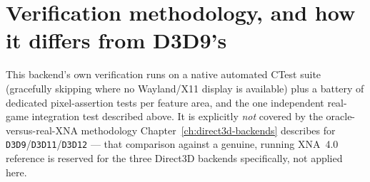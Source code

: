 \section{Verification methodology, and how it differs from D3D9's}

This backend's own verification runs on a native automated CTest suite (gracefully skipping
where no Wayland/X11 display is available) plus a battery of dedicated pixel-assertion tests
per feature area, and the one independent real-game integration test described above. It is
explicitly \emph{not} covered by the oracle-versus-real-XNA methodology
Chapter~\ref{ch:direct3d-backends} describes for \texttt{D3D9}/\texttt{D3D11}/\texttt{D3D12}
--- that comparison against a genuine, running XNA~4.0 reference is reserved for the three
Direct3D backends specifically, not applied here.
